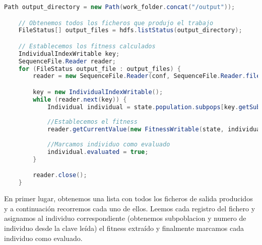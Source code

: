 \begin{lstlisting}[language=Java]
	Path output_directory = new Path(work_folder.concat("/output"));

	// Obtenemos todos los ficheros que produjo el trabajo
	FileStatus[] output_files = hdfs.listStatus(output_directory);

	// Establecemos los fitness calculados
	IndividualIndexWritable key;
	SequenceFile.Reader reader;
	for (FileStatus output_file : output_files) {
		reader = new SequenceFile.Reader(conf, SequenceFile.Reader.file(output_file.getPath()));

		key = new IndividualIndexWritable();
		while (reader.next(key)) {
			Individual individual = state.population.subpops[key.getSubpopulation()].individuals[key.getIndividual()];
			
			//Establecemos el fitness
			reader.getCurrentValue(new FitnessWritable(state, individual.fitness));
			
			//Marcamos individuo como evaluado
			individual.evaluated = true;
		}

		reader.close();
	}
\end{lstlisting}

En primer lugar, obtenemos una lista con todos los ficheros de salida producidos y a continuación recorremos cada uno de ellos. Leemos cada registro del fichero y asignamos al individuo correspondiente (obtenemos subpoblacion y numero de individuo desde la clave leída) el fitness extraído y finalmente marcamos cada individuo como evaluado.















